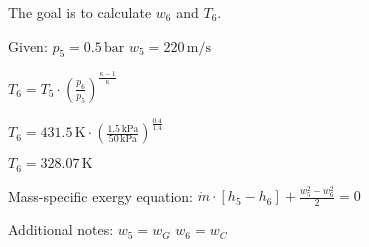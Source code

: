 The goal is to calculate \( w_6 \) and \( T_6 \).  

Given:  
\( p_5 = 0.5 \, \text{bar} \)  
\( w_5 = 220 \, \text{m/s} \)  

\( T_6 = T_5 \cdot \left( \frac{p_6}{p_5} \right)^{\frac{\kappa - 1}{\kappa}} \)  

\( T_6 = 431.5 \, \text{K} \cdot \left( \frac{1.5 \, \text{kPa}}{50 \, \text{kPa}} \right)^{\frac{0.4}{1.4}} \)  

\( T_6 = 328.07 \, \text{K} \)  

Mass-specific exergy equation:  
\( \dot{m} \cdot \left[ h_5 - h_6 \right] + \frac{w_5^2 - w_6^2}{2} = 0 \)  

Additional notes:  
\( w_5 = w_G \)  
\( w_6 = w_C \)